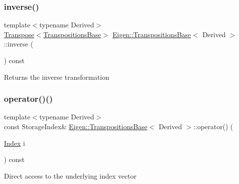 \subsubsection{\texorpdfstring{inverse()}{inverse()}}
{\footnotesize\ttfamily template$<$typename Derived$>$ \\
\mbox{\hyperlink{class_eigen_1_1_transpose}{Transpose}}$<$\mbox{\hyperlink{class_eigen_1_1_transpositions_base}{Transpositions\+Base}}$>$ \mbox{\hyperlink{class_eigen_1_1_transpositions_base}{Eigen\+::\+Transpositions\+Base}}$<$ Derived $>$\+::inverse (\begin{DoxyParamCaption}{ }\end{DoxyParamCaption}) const\hspace{0.3cm}{\ttfamily [inline]}}

\begin{DoxyReturn}{Returns}
the inverse transformation 
\end{DoxyReturn}
\mbox{\label{class_eigen_1_1_transpositions_base_a150860addd2418f37da291f0ad9395f2}} 
\subsubsection{\texorpdfstring{operator()()}{operator()()}\hspace{0.1cm}{\footnotesize\ttfamily [1/2]}}
{\footnotesize\ttfamily template$<$typename Derived$>$ \\
const Storage\+Index\& \mbox{\hyperlink{class_eigen_1_1_transpositions_base}{Eigen\+::\+Transpositions\+Base}}$<$ Derived $>$\+::operator() (\begin{DoxyParamCaption}\item[{\mbox{\hyperlink{class_eigen_1_1_transpositions_base_a3f5f06118b419e8e6ccbe49ed5b4c91f}{Index}}}]{i }\end{DoxyParamCaption}) const\hspace{0.3cm}{\ttfamily [inline]}}

Direct access to the underlying index vector \mbox{\label{class_eigen_1_1_transpositions_base_a8b3eb221d9ec1e51a161d276a0020e24}} 

